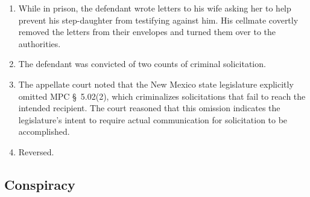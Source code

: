 \begin{enumerate}
    \item While in prison, the defendant wrote letters to his wife asking her 
    to help prevent his step-daughter from testifying against him. His 
    cellmate covertly removed the letters from their envelopes and turned them 
    over to the authorities.
    \item The defendant was convicted of two counts of criminal solicitation.
    \item The appellate court noted that the New Mexico state legislature 
    explicitly omitted MPC \S\ 5.02(2), which criminalizes solicitations that 
    fail to reach the intended recipient. The court reasoned that this 
    omission indicates the legislature's intent to require actual 
    communication for solicitation to be accomplished.
    \item Reversed.
\end{enumerate}

\subsection{Conspiracy}

